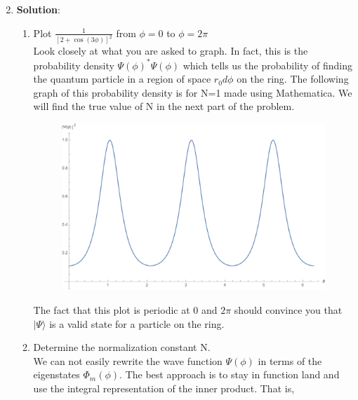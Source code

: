 \documentclass[usletter, 12pt]{article}
\begin{document}
\begin{enumerate}[leftmargin=0em, label=\textbf{\arabic*}.]
  \setcounter{enumi}{1} %
  \item \textbf{Solution}:\\
    \begin{enumerate}[leftmargin=2em, label=(\textbf{\alph*})]
    \item Plot $\displaystyle{\frac{1}{[2+\cos(3\phi)]^2}}$ from $\phi =0$ to
      $\phi=2\pi$ \\

      \noindent Look closely at what you are asked to graph. In fact, this is
      the probability density $\Psi(\phi)^*\Psi(\phi)$ which tells us the
      probability of finding the quantum particle in a region of space
      $r_0d\phi$ on the ring. The following graph of this probability density is
      for N=1 made using Mathematica. We will find the true value of N in the
      next part of the problem.\\
      \begin{figure}[!hbt]
        \centering
        \includegraphics[width=0.75\columnwidth]{prob_density_graph.pdf}
      \end{figure}

      \noindent The fact that this plot is periodic at $0$ and $2\pi$ should convince you
      that $|\Psi\rangle$ is a valid state for a particle on the ring.\\

      
    \item Determine the normalization constant N. \\
      
      \noindent We can not easily rewrite the wave function $\Psi(\phi)$ in terms
      of the eigenstates $\Phi_m(\phi)$. The best approach is to stay in
      function land and use the integral representation of the inner product.
      That is,


\end{enumerate}
\end{enumerate}
\end{document}
